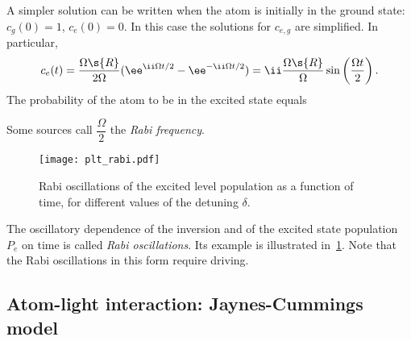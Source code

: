 \documentclass[fontsize=9pt,bookmarkpackage=false]{scrartcl}
\newcommand*{\mybx}[1]{\colorbox{mygr!15}{\hspace{1em}#1\hspace{1em}}}
\begin{document}
A simpler solution can be written when the atom is initially in the ground state: $c_g (0) = 1$, $c_e (0) = 0$.
In this case the solutions for $c_{e,g }$ are simplified.
In particular,
\begin{equation}
  c_e (t)
  = \frac{ \Omega\s{R} }{ 2 \Omega } ( \ee^{ \ii \Omega t / 2 } - \ee^{- \ii \Omega t /2 } )
  = \ii \frac{ \Omega\s{R} }{  \Omega } \sin \left( \frac{ \Omega t }{ 2 } \right).
\end{equation}
The probability of the atom to be in the excited state equals
Some sources call $\dfrac \Omega  2 $ the \emph{Rabi frequency}.

\begin{figure}[htb]
  \centering
  \texttt{[image: plt\_rabi.pdf]}
  \caption{Rabi oscillations of the excited level population as a function of time, for different values of the detuning $\delta$.}
  \label{fig:plt_rabi-pdf}
\end{figure}
The oscillatory dependence of the inversion and of the excited state population $P_e$ on time is called \emph{Rabi oscillations}.
Its example is illustrated in~\cref{fig:plt_rabi-pdf}.
Note that the Rabi oscillations in this form require driving.

\subsection{Atom-light interaction: Jaynes-Cummings model} %
\label{sec:atom_light_interaction_jaynes_cummings_model}
\end{document}
